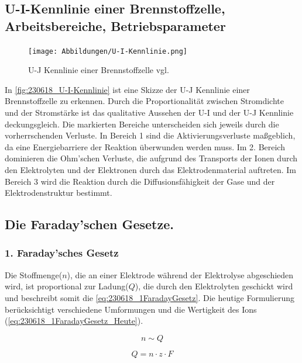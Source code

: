 \subsection{U-I-Kennlinie einer Brennstoffzelle, Arbeitsbereiche, Betriebsparameter}

\begin{figure}[H]
    \centering
    \texttt{[image: Abbildungen/U-I-Kennlinie.png]}
    \caption{U-J Kennlinie einer Brennstoffzelle vgl. \cite{BZ-Folien}}
    \label{fig:230618_U-I-Kennlinie}
\end{figure}

In \autoref{fig:230618_U-I-Kennlinie} ist eine Skizze der U-J Kennlinie einer Brennstoffzelle zu erkennen.
Durch die Proportionalität zwischen Stromdichte und der Stromstärke ist das qualitative Aussehen der U-I und der U-J Kennlinie deckungsgleich.
Die markierten Bereiche unterscheiden sich jeweils durch die vorherrschenden Verluste.
In Bereich 1 sind die Aktivierungsverluste maßgeblich, da eine Energiebarriere der Reaktion überwunden werden muss.
Im 2. Bereich dominieren die Ohm'schen Verluste, die aufgrund des Transports der Ionen durch den Elektrolyten und der Elektronen durch das Elektrodenmaterial auftreten.
Im Bereich 3 wird die Reaktion durch die Diffusionsfähigkeit der Gase und der Elektrodenstruktur bestimmt.
\newpage
\subsection{Die Faraday'schen Gesetze.}

\subsubsection{1. Faraday'sches Gesetz}

Die Stoffmenge($n$), die an einer Elektrode während der Elektrolyse abgeschieden wird, ist proportional zur Ladung($Q$), die durch den Elektrolyten geschickt wird \cite{Faraday_G} und beschreibt somit die \autoref{eq:230618_1FaradayGesetz}.
Die heutige Formulierung berücksichtigt verschiedene Umformungen und die Wertigkeit des Ions (\autoref{eq:230618_1FaradayGesetz_Heute}).

\begin{equation}
    n \sim Q
    \label{eq:230618_1FaradayGesetz}
\end{equation}

\begin{equation}
    Q = n \cdot z \cdot F
    \label{eq:230618_1FaradayGesetz_Heute}
\end{equation}

